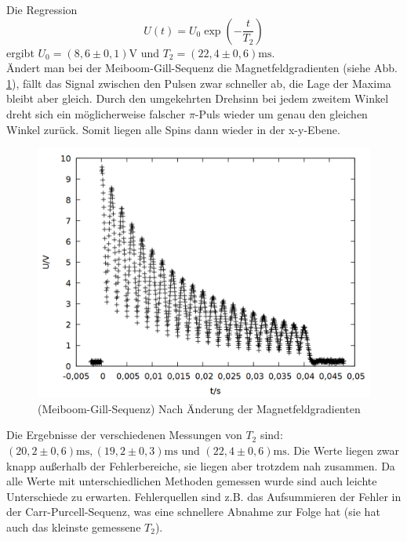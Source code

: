 Die Regression $$U(t) = U_0\exp{\left(-\frac{t}{T_2}\right)}$$ ergibt $U_0 = (8,6\pm 0,1)\si{\volt}$ und $T_2 = (22,4\pm 0,6) \si{\milli\second}$.\\

Ändert man bei der Meiboom-Gill-Sequenz die Magnetfeldgradienten (siehe Abb. \ref{fig:gill_b}), fällt das Signal zwischen den Pulsen zwar schneller ab, die Lage der Maxima bleibt aber gleich. Durch den umgekehrten Drehsinn bei jedem zweitem Winkel dreht sich ein möglicherweise falscher $\pi$-Puls wieder um genau den gleichen Winkel zurück. Somit liegen alle Spins dann wieder in der x-y-Ebene.\\
  
\begin{figure}[h]
\centering
\includegraphics[width=0.75\linewidth]{data/p402_443_data/meiboom_gill_sequenz/plot_161.png}
\caption{(Meiboom-Gill-Sequenz) Nach Änderung der Magnetfeldgradienten}
\label{fig:gill_b}
\end{figure}

Die Ergebnisse der verschiedenen Messungen von $T_2$ sind: $(20,2\pm 0,6) \si{\milli\second},  (19,2\pm 0,3) \si{\milli\second}$ und $(22,4\pm 0,6) \si{\milli\second}$. Die Werte liegen zwar knapp außerhalb der Fehlerbereiche, sie liegen aber trotzdem nah zusammen. Da alle Werte mit unterschiedlichen Methoden gemessen wurde sind auch leichte Unterschiede zu erwarten. Fehlerquellen sind z.B. das Aufsummieren der Fehler in der Carr-Purcell-Sequenz, was eine schnellere Abnahme zur Folge hat (sie hat auch das kleinste gemessene $T_2$).
